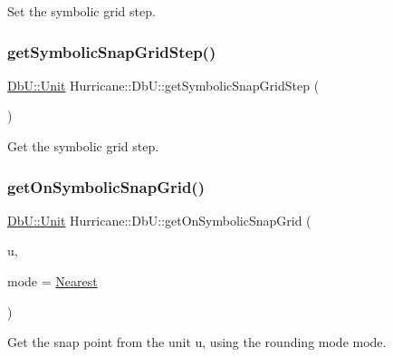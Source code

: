 Set the symbolic grid step. \mbox{\label{group__DbUGroup_ga687a9134729b107c42fb7f69596c4c3b}} 
\subsubsection{\texorpdfstring{get\+Symbolic\+Snap\+Grid\+Step()}{getSymbolicSnapGridStep()}}
{\footnotesize\ttfamily \hyperlink{group__DbUGroup_ga4fbfa3e8c89347af76c9628ea06c4146}{Db\+U\+::\+Unit} Hurricane\+::\+Db\+U\+::get\+Symbolic\+Snap\+Grid\+Step (\begin{DoxyParamCaption}{ }\end{DoxyParamCaption})\hspace{0.3cm}{\ttfamily [static]}}

Get the symbolic grid step. \mbox{\label{group__DbUGroup_gad1b0c0f3680093cf5a63d901312c925d}} 
\subsubsection{\texorpdfstring{get\+On\+Symbolic\+Snap\+Grid()}{getOnSymbolicSnapGrid()}}
{\footnotesize\ttfamily \hyperlink{group__DbUGroup_ga4fbfa3e8c89347af76c9628ea06c4146}{Db\+U\+::\+Unit} Hurricane\+::\+Db\+U\+::get\+On\+Symbolic\+Snap\+Grid (\begin{DoxyParamCaption}\item[{\hyperlink{group__DbUGroup_ga4fbfa3e8c89347af76c9628ea06c4146}{Db\+U\+::\+Unit}}]{u,  }\item[{\hyperlink{group__DbUGroup_ga1082168d6f9956ebba22ab8bbec21637}{Db\+U\+::\+Snap\+Mode}}]{mode = {\ttfamily \hyperlink{group__DbUGroup_gga1082168d6f9956ebba22ab8bbec21637a65e6f47eb16779b8974a80d6145a2db5}{Nearest}} }\end{DoxyParamCaption})\hspace{0.3cm}{\ttfamily [static]}}

Get the snap point from the unit {\ttfamily u}, using the rounding mode {\ttfamily mode}. \mbox{\label{group__DbUGroup_ga87323d9038656dceabffc37d45de408a}} 
